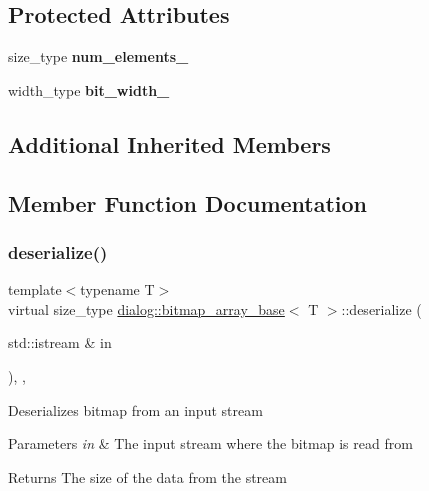 \subsection*{Protected Attributes}
\begin{DoxyCompactItemize}
\item 
\mbox{\label{classdialog_1_1bitmap__array__base_a8c831f6a67020d74dc29401c0dd9bce4}} 
size\+\_\+type {\bfseries num\+\_\+elements\+\_\+}
\item 
\mbox{\label{classdialog_1_1bitmap__array__base_a63b0af9fb47d61115af1e8f1038fcb02}} 
width\+\_\+type {\bfseries bit\+\_\+width\+\_\+}
\end{DoxyCompactItemize}
\subsection*{Additional Inherited Members}


\subsection{Member Function Documentation}
\mbox{\label{classdialog_1_1bitmap__array__base_a51a91fced01d96475dc24e23da2d06e8}} 
\subsubsection{\texorpdfstring{deserialize()}{deserialize()}}
{\footnotesize\ttfamily template$<$typename T$>$ \\
virtual size\+\_\+type \hyperlink{classdialog_1_1bitmap__array__base}{dialog\+::bitmap\+\_\+array\+\_\+base}$<$ T $>$\+::deserialize (\begin{DoxyParamCaption}\item[{std\+::istream \&}]{in }\end{DoxyParamCaption})\hspace{0.3cm}{\ttfamily [inline]}, {\ttfamily [override]}, {\ttfamily [virtual]}}

Deserializes bitmap from an input stream 
\begin{DoxyParams}{Parameters}
{\em in} & The input stream where the bitmap is read from \\
\hline
\end{DoxyParams}
\begin{DoxyReturn}{Returns}
The size of the data from the stream 
\end{DoxyReturn}


